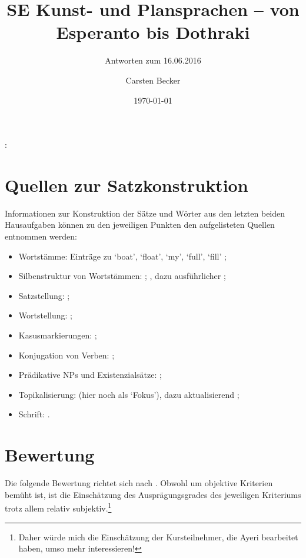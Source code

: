 \documentclass[12pt,paper=a4]{scrartcl}
\author{Carsten Becker}
\title{SE Kunst- und Plansprachen -- von Esperanto bis Dothraki}
\subtitle{Antworten zum 16.06.2016}
\date{\today} %
\newcommand{\qq}[1]{\enquote*{#1}} %
\newenvironment{mytitle}{
    \hfill
    \begin{minipage}{0.667\textwidth}
	\vspace{\baselineskip}
	\begin{center}
	    \Large
	    \sffamily\bfseries
	    \makeatletter
}{
	    \makeatother
	\end{center}
	\vspace{1em}
    \end{minipage}
    \hfill
}
\begin{document}

\begin{mytitle}
    \@title: \@subtitle\footnotemark
\end{mytitle}

\section{Quellen zur Satzkonstruktion}

\noindent Informationen zur Konstruktion der Sätze und Wörter aus den letzten 
beiden Hausaufgaben können zu den jeweiligen Punkten den aufgelisteten Quellen 
entnommen werden:

\begin{itemize}
\item Wortstämme: Einträge zu `boat', `float', `my', `full', `fill' 
	\parencite[Dictionary]{benung};
\item Silbenstruktur von Wortstämmen: \cite{becker2010}; \cite[5]{becker2011}, 
	dazu ausführlicher \cite{benung:syllablestress};
\item Satzstellung: \cites[27]{becker2011}[§~2.1]{benung:flickingswitches};
\item Wortstellung: \cite[20--21, 28--29]{becker2011};
\item Kasusmarkierungen: \cite[36--37, 39]{becker2011};
\item Konjugation von Verben: \cites[17--20]{becker2011}{benung:verbagreement};
\item Prädikative NPs und Existenzialsätze: 
	\cite[43--44]{becker2011};
\item Topikalisierung: \cite[27--28]{becker2011} (hier noch als \qq{Fokus}), 
	dazu aktualisierend \cite[§§~1 und 2.1]{benung:flickingswitches};
\item Schrift: \cites[Alphabet]{benung}{tagatibookg:readme}.
\end{itemize}

\section{Bewertung}

Die folgende Bewertung richtet sich nach \cite{sai:conlangeval}. Obwohl 
\citeauthor{sai:conlangeval} um objektive Kriterien bemüht ist, ist die 
Einschätzung des Ausprägungsgrades des jeweiligen Kriteriums trotz allem relativ 
subjektiv.\footnote{Daher würde mich die Einschätzung der Kursteilnehmer, die 
Ayeri bearbeitet haben, umso mehr interessieren!}
\end{document}
